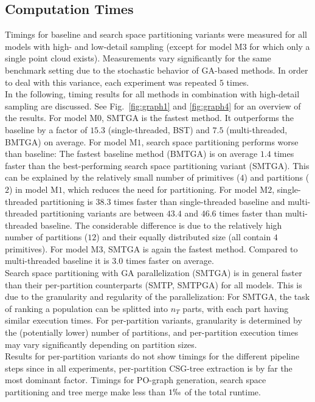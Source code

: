 \subsection{Computation Times}  
Timings for baseline and search space partitioning variants were measured for all models with high- and low-detail sampling (except for model M$3$ for which only a single point cloud exists).
Measurements vary significantly for the same benchmark setting due to the stochastic behavior of \ac{GA}-based methods. 
In order to deal with this variance, each experiment was repeated $5$ times.
\\
In the following, timing results for all methods in combination with high-detail sampling are discussed.
See Fig.~\ref{fig:graph1} and \ref{fig:graph4} for an overview of the results. 
For model M$0$, SMTGA is the fastest method. 
It outperforms the baseline by a factor of $15.3$ (single-threaded, BST) and $7.5$ (multi-threaded, BMTGA) on average.
For model M$1$, search space partitioning performs worse than baseline: 
The fastest baseline method (BMTGA) is on average $1.4$ times faster than the best-performing search space partitioning variant (SMTGA).
This can be explained by the relatively small number of primitives ($4$) and partitions ($2$) in model M$1$, which reduces the need for partitioning.
For model M$2$, single-threaded partitioning is $38.3$ times faster than single-threaded baseline and multi-threaded partitioning variants are between $43.4$ and $46.6$ times faster than multi-threaded baseline.  
The considerable difference is due to the relatively high number of partitions ($12$) and their equally distributed size (all contain $4$ primitives).
For model M$3$, SMTGA is again the fastest method. 
Compared to multi-threaded baseline it is $3.0$ times faster on average.
\\
Search space partitioning with \ac{GA} parallelization (SMTGA) is in general faster than their per-partition counterparts (SMTP, SMTPGA) for all models.
This is due to the granularity and regularity of the parallelization: 
For SMTGA, the task of ranking a population can be splitted into $n_T$ parts, with each part having similar execution times.
For per-partition variants, granularity is determined by the (potentially lower) number of partitions, and per-partition execution times may vary significantly depending on partition sizes. 
\\
Results for per-partition variants do not show timings for the different pipeline steps since in all experiments, per-partition \ac{CSG}-tree extraction is by far the most dominant factor.
Timings for \ac{PO}-graph generation, search space partitioning and tree merge make less than $1\permil$ of the total runtime.
